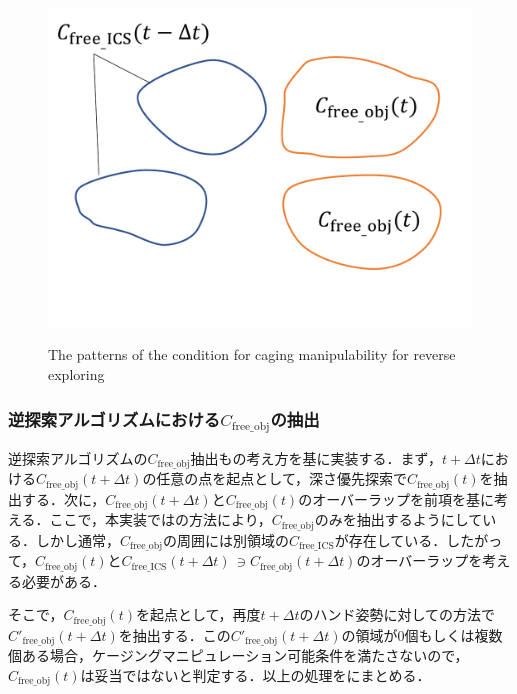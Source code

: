 \documentclass[a4paper,twoside,12pt,papersize, dvipdfmx]{iirthesis}
\begin{document}
\begin{figure}[b]
\begin{minipage}{0.33\hsize}
\subcaption{}\label{fig::planner::cm2}
\end{minipage}\hfill
\begin{minipage}{0.33\hsize}
\includegraphics[width=\hsize]{fig/3-new-planner/rev_cagingmani_ver3.pdf}
\subcaption{}\label{fig::planner::cm3}
\end{minipage}
\caption{The patterns of the condition for caging manipulability for reverse exploring}
\label{fig::planner::cm}
\end{figure}

\subsubsection{逆探索アルゴリズムにおける$C_{\mathrm{free\_obj}}$の抽出}
逆探索アルゴリズムの$C_{\mathrm{free\_obj}}$抽出もの考え方を基に実装する．まず，$t+\Delta t$における$C_{\mathrm{free\_obj}}(t+\Delta t)$の任意の点を起点として，深さ優先探索で$C_{\mathrm{free\_obj}}(t)$を抽出する．次に，$C_{\mathrm{free\_obj}}(t+\Delta t)$と$C_{\mathrm{free\_obj}}(t)$のオーバーラップを前項を基に考える．ここで，本実装ではの方法により，$C_{\mathrm{free\_obj}}$のみを抽出するようにしている．しかし通常，$C_{\mathrm{free\_obj}}$の周囲には別領域の$C_{\mathrm{free\_ICS}}$が存在している．したがって，$C_{\mathrm{free\_obj}}(t)$と$C_{\mathrm{free\_ICS}}(t+\Delta t)\, \ni C_{\mathrm{free\_obj}}(t+\Delta t)$のオーバーラップを考える必要がある．\par
そこで，$C_{\mathrm{free\_obj}}(t)$を起点として，再度$t+\Delta t$のハンド姿勢に対しての方法で$C'_{\mathrm{free\_obj}}(t+\Delta t)$を抽出する．この$C'_{\mathrm{free\_obj}}(t+\Delta t)$の領域が0個もしくは複数個ある場合，ケージングマニピュレーション可能条件を満たさないので，$C_{\mathrm{free\_obj}}(t)$は妥当ではないと判定する．以上の処理をにまとめる．
\end{document}
